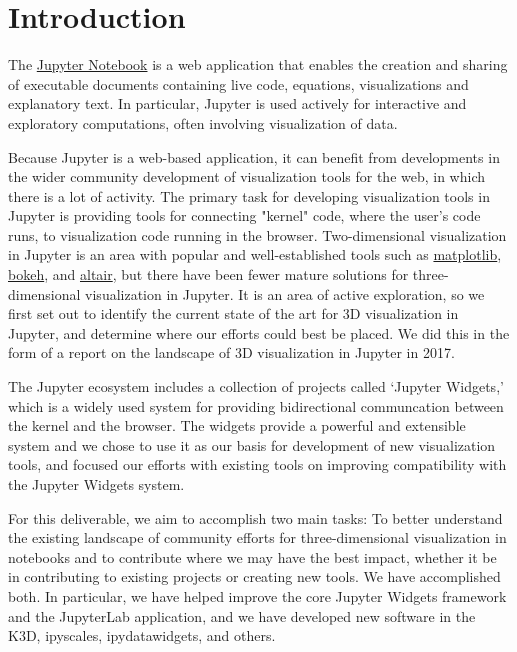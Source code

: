 \documentclass{deliverablereport}
\author{Benjamin Ragan-Kelley, Vidar Tonaas Fauske, Marcin Kostur}
\begin{document}
\maketitle
\tableofcontents


\section{Introduction}

The \href{https://jupyter.org}{Jupyter Notebook} is a web application
that enables the creation and sharing of executable documents
containing live code, equations, visualizations and explanatory text.
In particular, Jupyter is used actively for interactive and exploratory computations,
often involving visualization of data.

Because Jupyter is a web-based application,
it can benefit from developments in the wider community development of visualization tools for the web, in which there is a lot of activity.
The primary task for developing visualization tools in Jupyter is providing tools for connecting
"kernel" code, where the user's code runs,
to visualization code running in the browser.
Two-dimensional visualization in Jupyter is an area with popular and well-established tools
such as \href{https://matplotlib.org}{matplotlib}, \href{https://bokeh.pydata.org/}{bokeh}, and \href{https://altair-viz.github.io}{altair},
but there have been fewer mature solutions for three-dimensional visualization in Jupyter.
It is an area of active exploration,
so we first set out to identify the current state of the art for 3D visualization in Jupyter,
and determine where our efforts could best be placed.
We did this in the form of a report on the landscape of 3D visualization in Jupyter in 2017.

The Jupyter ecosystem includes a collection of projects called `Jupyter Widgets,'
which is a widely used system for providing bidirectional communcation
between the kernel and the browser.
The widgets provide a powerful and extensible system and we chose to use it as our basis for development of new visualization tools,
and focused our efforts with existing tools on improving compatibility with the Jupyter Widgets system.

For this deliverable, we aim to accomplish two main tasks: To better
understand the existing landscape of community efforts for three-dimensional
visualization in notebooks and to contribute where we may have the best
impact, whether it be in contributing to existing projects or creating new
tools. We have accomplished both. In particular, we have helped improve the
core Jupyter Widgets framework and the JupyterLab application, and we have
developed new software in the K3D, ipyscales, ipydatawidgets, and others.
\end{document}
